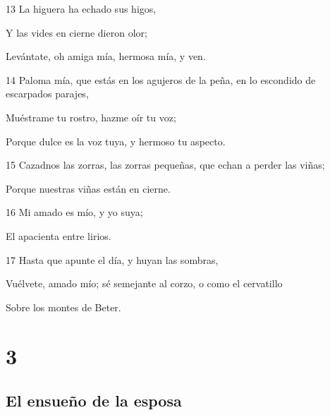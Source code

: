 \par 13 La higuera ha echado sus higos,
\par Y las vides en cierne dieron olor;
\par Levántate, oh amiga mía, hermosa mía, y ven.
\par 14 Paloma mía, que estás en los agujeros de la peña, en lo escondido de escarpados parajes,
\par Muéstrame tu rostro, hazme oír tu voz;
\par Porque dulce es la voz tuya, y hermoso tu aspecto.
\par 15 Cazadnos las zorras, las zorras pequeñas, que echan a perder las viñas;
\par Porque nuestras viñas están en cierne.
\par 16 Mi amado es mío, y yo suya;
\par El apacienta entre lirios.
\par 17 Hasta que apunte el día, y huyan las sombras,
\par Vuélvete, amado mío; sé semejante al corzo, o como el cervatillo
\par Sobre los montes de Beter. 

\chapter{3}

\section*{El ensueño de la esposa}

